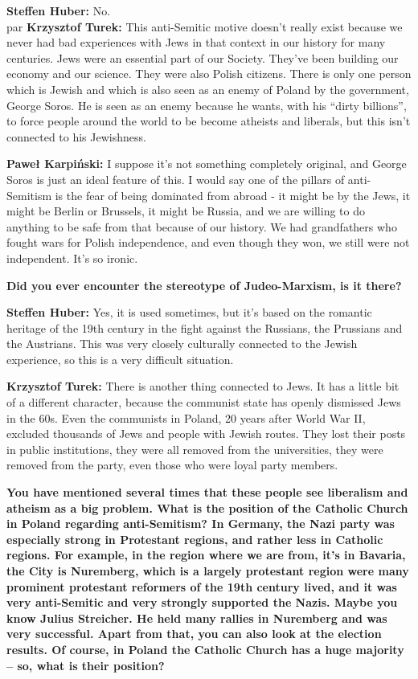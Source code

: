 \textbf{Steffen Huber:} No.\\par
\textbf{Krzysztof Turek:} This anti-Semitic motive doesn’t really exist because we never had bad experiences with Jews in that context in our history for many centuries. Jews were an essential part of our Society. They've been building our economy and our science. They were also Polish citizens. There is only one person which is Jewish and which is also seen as an enemy of Poland by the government, George Soros. He is seen as an enemy because he wants, with his “dirty billions”, to force people around the world to be become atheists and liberals, but this isn’t connected to his Jewishness.\par
\textbf{Paweł Karpiński:} I suppose it's not something completely original, and George Soros is just an ideal feature of this. I would say one of the pillars of anti-Semitism is the fear of being dominated from abroad - it might be by the Jews, it might be Berlin or Brussels, it might be Russia, and we are willing to do anything to be safe from that because of our history. We had grandfathers who fought wars for Polish independence, and even though they won, we still were not independent. It's so ironic.  

\textbf{Did you ever encounter the stereotype of Judeo-Marxism, is it there?} 

\textbf{Steffen Huber:} Yes, it is used sometimes, but it's based on the romantic heritage of the 19th century in the fight against the Russians, the Prussians and the Austrians. This was very closely culturally connected to the Jewish experience, so this is a very difficult situation.\par
\textbf{Krzysztof Turek:} There is another thing connected to Jews. It has a little bit of a different character, because the communist state has openly dismissed Jews in the 60s. Even the communists in Poland, 20 years after World War II, excluded thousands of Jews and people with Jewish routes. They lost their posts in public institutions, they were all removed from the universities, they were removed from the party, even those who were loyal party members. 

\textbf{You have mentioned several times that these people see liberalism and atheism as a big problem. What is the position of the Catholic Church in Poland regarding anti-Semitism? In Germany, the Nazi party was especially strong in Protestant regions, and rather less in Catholic regions. For example, in the region where we are from, it's in Bavaria, the City is Nuremberg, which is a largely protestant region were many prominent protestant reformers of the 19th century lived, and it was very anti-Semitic and very strongly supported the Nazis. Maybe you know Julius Streicher. He held many rallies in Nuremberg and was very successful. Apart from that, you can also look at the election results. Of course, in Poland the Catholic Church has a huge majority – so, what is their position?} 


